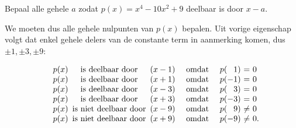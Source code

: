 \documentclass{ximera}
\begin{document}
\begin{example} 
	Bepaal alle gehele $a$ zodat  $p(x) = x^4-10x^2+9$ deelbaar is door $x-a$.
	 
	We moeten dus alle gehele nulpunten van $p(x)$ bepalen. Uit vorige eigenschap volgt dat enkel gehele delers van de constante term in aanmerking komen, dus $\pm1,\pm3,\pm9$:
	 
	\renewcommand{\bullet}{}   %
	\[
	\begin{array}{lr@{\,}c@{\,}lcl@{}c@{}r@{}c@{\ }c@{\ }l}
	\bullet&p(x)&\textrm{ is deelbaar door }   &(x-1)&\textrm{ omdat }&p&(& 1&)&=   &0\\
	\bullet&p(x)&\textrm{ is deelbaar door }   &(x+1)&\textrm{ omdat }&p&(&-1&)&=   &0\\
	\bullet&p(x)&\textrm{ is deelbaar door }    &(x-3)&\textrm{ omdat }&p&(& 3&)&=   &0\\
	\bullet&p(x)&\textrm{ is deelbaar door }   &(x+3)&\textrm{ omdat }&p&(&-3&)&=   &0\\
	\bullet&p(x)&\textrm{ is niet deelbaar door }&(x-9)&\textrm{ omdat }&p&(& 9&)&\neq&0\\
	\bullet&p(x)&\textrm{ is niet deelbaar door }&(x+9)&\textrm{ omdat }&p&(&-9&)&\neq&0.
	\end{array}
	\]
	 
\end{example}
	 
\end{document}
